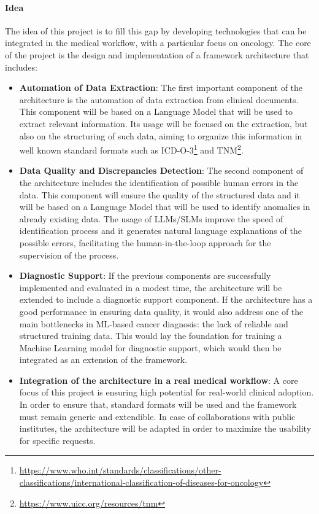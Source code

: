 \documentclass[11pt]{scrartcl}
\begin{document}
\paragraph{Idea}
{The idea of this project is to fill this gap by developing technologies that can be integrated in the medical workflow, with a particular focus on oncology. 
The core of the project is the design and implementation of a framework architecture that includes:
\begin{itemize}
    \item \textbf{Automation of Data Extraction}: The first important component of the architecture is the automation of data extraction from clinical documents. This component will be based on a Language Model that will be used to extract relevant information. Its usage will be focused on the extraction, but also on the structuring of such data, aiming to organize this information in well known standard formats such as ICD-O-3\footnote{\url{https://www.who.int/standards/classifications/other-classifications/international-classification-of-diseases-for-oncology}} and TNM\footnote{\url{https://www.uicc.org/resources/tnm}}.
    \item \textbf{Data Quality and Discrepancies Detection}: The second component of the architecture includes the identification of possible human errors in the data. This component will ensure the quality of the structured data and it will be based on a Language Model that will be used to identify anomalies in already existing data. The usage of LLMs/SLMs improve the speed of identification process and it generates natural language explanations of the possible errors, facilitating the human-in-the-loop approach for the supervision of the process. 
    \item \textbf{Diagnostic Support}: If the previous components are successfully implemented and evaluated in a modest time, the architecture will be extended to include a diagnostic support component.
If the architecture has a good performance in ensuring data quality, it would also address one of the main bottlenecks in ML-based cancer diagnosis: the lack of reliable and structured training data. This would lay the foundation for training a Machine Learning model for diagnostic support, which would then be integrated as an extension of the framework.
   \item \textbf{Integration of the architecture in a real medical workflow}: A core focus of this project is ensuring high potential for real-world clinical adoption. In order to ensure that, standard formats will be used and the framework must remain generic and extendible.
In case of collaborations with public institutes, the architecture will be adapted in order to maximize the usability for specific requests.
\end{itemize}}
\end{document}
